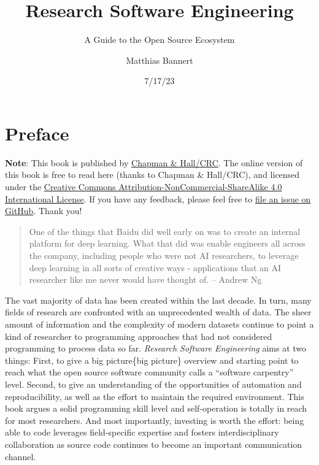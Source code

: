 \documentclass[
  12pt,
  letterpaper,
]{krantz}
\title{Research Software Engineering}
\subtitle{A Guide to the Open Source Ecosystem}
\author{Matthias Bannert}
\date{7/17/23}
\renewcommand*\contentsname{Table of contents}
\newcommand\contentsname{Table of contents}
\begin{document}
\maketitle
\ifdefined\Shaded\renewenvironment{Shaded}{\begin{tcolorbox}[boxrule=0pt, enhanced, breakable, interior hidden, frame hidden, borderline west={3pt}{0pt}{shadecolor}, sharp corners]}{\end{tcolorbox}}\fi

\renewcommand*\contentsname{Table of contents}
{
\hypersetup{linkcolor=}
\setcounter{tocdepth}{2}
\tableofcontents
}
\listoffigures
\listoftables
{}

\hypertarget{preface}{%
\chapter*{Preface}\label{preface}}


\textbf{Note}: This book is published by
\href{https://www.routledge.com/}{Chapman \& Hall/CRC}. The online
version of this book is free to read here (thanks to Chapman \&
Hall/CRC), and licensed under the
\href{http://creativecommons.org/licenses/by-nc-sa/4.0/}{Creative
Commons Attribution-NonCommercial-ShareAlike 4.0 International License}.
If you have any feedback, please feel free to
\href{https://github.com/rse-book/rse-book.github.io/issues}{file an
issue on GitHub}. Thank you!

\begin{quote}
One of the things that Baidu did well early on was to create an internal
platform for deep learning. What that did was enable engineers all
across the company, including people who were not AI researchers, to
leverage deep learning in all sorts of creative ways - applications that
an AI researcher like me never would have thought of. -- Andrew Ng
\end{quote}

The vast majority of data has been created within the last decade. In
turn, many fields of research are confronted with an unprecedented
wealth of data. The sheer amount of information and the complexity of
modern datasets continue to point a kind of researcher to programming
approaches that had not considered programming to process data so far.
\emph{Research Software Engineering} aims at two things: First, to give
a big picture\{big picture\} overview and starting point to reach what
the open source software community calls a ``software carpentry'' level.
Second, to give an understanding of the opportunities of
automation and reproducibility, as well as the effort
to maintain the required environment. This book argues a solid
programming skill level and self-operation is totally in reach for most
researchers. And most importantly, investing is worth the effort: being
able to code leverages field-specific expertise and fosters
interdisciplinary collaboration as source code continues to become an
important communication channel.
\end{document}

